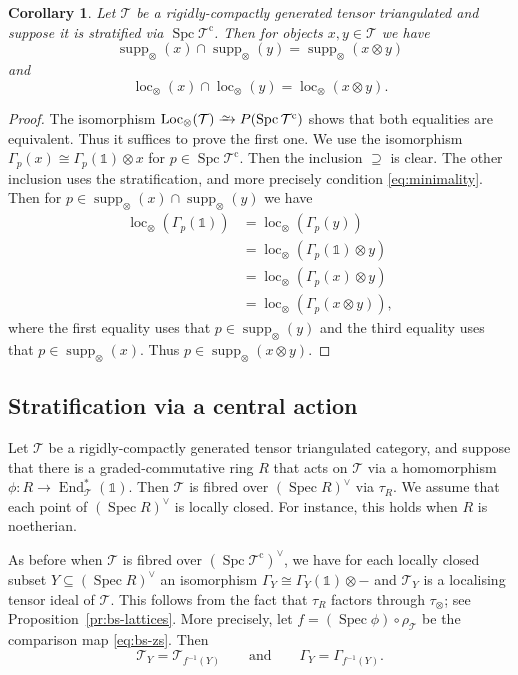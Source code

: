 \documentclass{amsart}[a4]
\newtheorem{corollary}[theorem]{Corollary}
\theoremstyle{definition}
\theoremstyle{remark}
\numberwithin{equation}{section}
\newcommand{\End}{\operatorname{End}}
\newcommand{\loc}{\operatorname{loc}}
\newcommand{\Loc}{\operatorname{Loc}}
\newcommand{\Spc}{\operatorname{Spc}}
\newcommand{\Spec}{\operatorname{Spec}}
\newcommand{\supp}{\operatorname{supp}}
\newcommand{\iso}{\xrightarrow{\raisebox{-.6ex}[0ex][0ex]{$\scriptstyle{\sim}$}}}
\newcommand{\cat}{\mathcal}
\newcommand{\one}{\mathds 1}
\let\Gamma\varGamma
\begin{document}
\begin{corollary}
  Let $\cat T$ be a rigidly-compactly generated tensor triangulated
  and suppose it is stratified via $\Spc\cat T^{\mathrm c}$. Then for
  objects $x,y\in\cat T$ we have
  \[\supp_\otimes(x)\cap \supp_\otimes(y)=\supp_\otimes(x\otimes y)\]
  and
  \[\loc_\otimes(x)\cap \loc_\otimes(y)=\loc_\otimes(x\otimes y).\]
\end{corollary}
\begin{proof}
  The isomorphism $\Loc_\otimes(\cat T)\iso P(\Spc\cat T^{\mathrm c})$
  shows that both equalities are equivalent. Thus it suffices to prove
  the first one. We use the isomorphism
  $\Gamma_p(x)\cong\Gamma_p(\one)\otimes x$ for
  $p\in\Spc\cat T^{\mathrm c}$.  Then the inclusion $\supseteq$ is
  clear. The other inclusion uses the stratification, and more
  precisely condition \eqref{eq:minimality}.  Then for
  $p\in \supp_\otimes(x)\cap \supp_\otimes(y)$ we have
\begin{align*}
  \loc_\otimes(\Gamma_p(\one))
  &=\loc_\otimes(\Gamma_p(y))\\
  &=\loc_\otimes(\Gamma_p(\one)\otimes y)\\
  &=\loc_\otimes(\Gamma_p(x)\otimes y) \\
  &=\loc_\otimes(\Gamma_p(x\otimes y)),
\end{align*}
where the first equality uses that $p\in\supp_\otimes(y)$ and the
third equality uses that $p\in\supp_\otimes(x)$.  Thus
$p\in\supp_\otimes(x\otimes y)$.
\end{proof}


\subsection*{Stratification via a central action}

Let $\cat T$ be a rigidly-compactly generated tensor triangulated
category, and suppose that there is a graded-com\-mu\-ta\-tive
ring $R$ that acts on $\cat T$ via  a homomorphism $\phi\colon R\to\End^*_{\cat
  T}(\one)$. Then $\cat T$ is fibred over $(\Spec R)^\vee$ via
$\tau_R$. We assume that each point of  $(\Spec R)^\vee$ is locally
closed. For instance, this holds when $R$ is noetherian.

As before when $\cat T$ is fibred over $(\Spc \cat T^{\mathrm c})^\vee$, we have
for each locally closed subset $Y\subseteq (\Spec R)^\vee$ an
isomorphism $\Gamma_Y\cong\Gamma_Y(\one)\otimes-$ and $\cat T_Y$
is a localising tensor ideal of $\cat T$. This follows from the fact
that $\tau_R$ factors through $\tau_\otimes$; see
Proposition~\ref{pr:bs-lattices}. More precisely, let
$f=(\Spec\phi)\circ\rho_\cat T$ be the comparison map
\eqref{eq:bs-zs}. Then
\[\cat T_Y=\cat T_{f^{-1}(Y)}\qquad\text{and}\qquad\Gamma_Y=\Gamma_{f^{-1}(Y)}.\]
\end{document}
